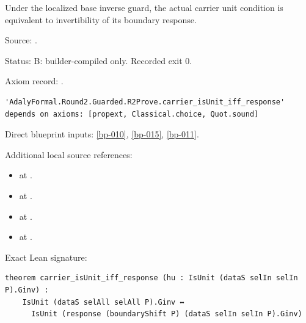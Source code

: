 \begin{theorem}[bp-016]
\label{bp-016}
\leanok
Under the localized base inverse guard, the actual carrier unit condition is equivalent to invertibility of its boundary response.

\par Source: \texttt{}.
\par Status: B: builder-compiled only. Recorded exit 0.
\par Axiom record: \texttt{}.
\begin{verbatim}
'AdalyFormal.Round2.Guarded.R2Prove.carrier_isUnit_iff_response' depends on axioms: [propext, Classical.choice, Quot.sound]
\end{verbatim}
\par Direct blueprint inputs: \ref{bp-010}, \ref{bp-015}, \ref{bp-011}.
\par Additional local source references:
\begin{itemize}
\item \texttt{} at \texttt{}.
\item \texttt{} at \texttt{}.
\item \texttt{} at \texttt{}.
\item \texttt{} at \texttt{}.
\end{itemize}
\par Exact Lean signature:
\begin{verbatim}
theorem carrier_isUnit_iff_response (hu : IsUnit (dataS selIn selIn P).Ginv) :
    IsUnit (dataS selAll selAll P).Ginv ↔
      IsUnit (response (boundaryShift P) (dataS selIn selIn P).Ginv)
\end{verbatim}
\end{theorem}

